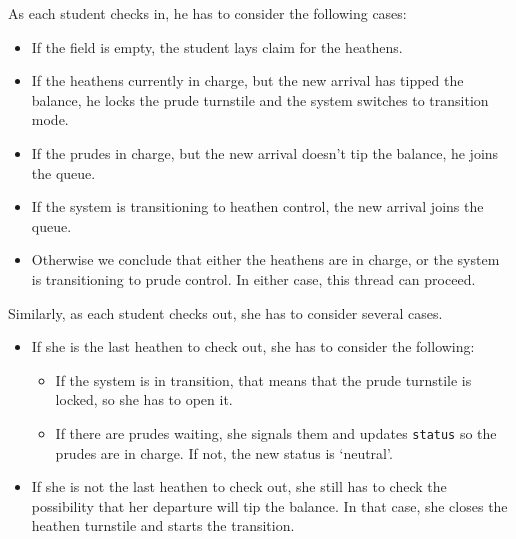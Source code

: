\documentclass{book}
\begin{document}
As each student checks in, he has to
consider the following cases:

\begin{itemize}

\item If the field is empty, the student lays claim for the heathens.

\item If the heathens currently in charge, but the new arrival
has tipped the balance, he locks the prude turnstile and the
system switches to transition mode.

\item If the prudes in charge, but the new arrival doesn't
tip the balance, he joins the queue.

\item If the system is transitioning to heathen control, the new arrival
joins the queue.

\item Otherwise we conclude that either the heathens are in charge, or the
system is transitioning to prude control.  In either case, this
thread can proceed.

\end{itemize}  

Similarly, as each student checks out, she has to consider several
cases.  

\begin{itemize}

\item If she is the last heathen to check out, she has to
consider the following:

    \begin{itemize}

    \item If the system is in transition, that means that the prude
      turnstile is locked, so she has to open it.

    \item If there are prudes waiting, she signals them and
      updates {\tt status} so the prudes are in charge.  If not, the
      new status is `neutral'.

    \end{itemize}  

\item If she is not the last heathen to check out, she still has to
check the possibility that her departure will tip the balance.  In
that case, she closes the heathen turnstile and starts the
transition.

\end{itemize}
\end{document}
